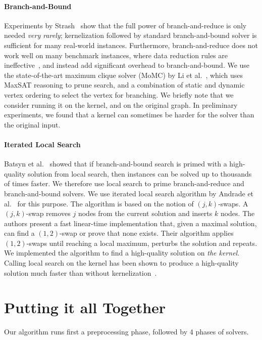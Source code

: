 \documentclass[a4paper,UKenglish]{lipics-v2016}
\begin{document}
\paragraph*{Branch-and-Bound} Experiments by Strash~\cite{} show that the full power of branch-and-reduce is only needed \emph{very rarely}; kernelization followed by standard branch-and-bound solver is sufficient for many real-world instances. Furthermore, branch-and-reduce does not work well on many benchmark instances, where data reduction rules are ineffective~\cite{akiba-tcs-2016}, and instead add significant overhead to branch-and-bound.  We use the state-of-the-art maximum clique solver (MoMC) by Li et al.~\cite{}, which uses MaxSAT reasoning to prune search, and a combination of static and dynamic vertex ordering to select the vertex for branching. We briefly note that we consider running it on the kernel, and on the original graph. In preliminary experiments, we found that a kernel can sometimes be harder for the solver than the original input.

\paragraph*{Iterated Local Search}
Batsyn et al.~\cite{} showed that if branch-and-bound search is primed with a high-quality solution from local search, then instances can be solved up to thousands of times faster. We therefore use local search to prime branch-and-reduce and branch-and-bound solvers. 
We use iterated local search algorithm by Andrade et al.~\cite{DBLP:conf/wea/AndradeRW08} for this purpose.
The algorithm is based on the notion of $(j,k)$-swaps. A $(j,k)$-swap removes $j$ nodes from the current solution and inserts $k$ nodes. The authors present a fast linear-time implementation that, given a maximal solution, can find a $(1,2)$-swap or prove that none exists. Their algorithm applies $(1,2)$-swaps until reaching a local maximum, perturbs the solution and repeats. We implemented the algorithm to find a high-quality solution on \emph{the kernel}. Calling local search on the kernel has been shown to produce a high-quality solution much faster than without kernelization~\cite{dahlum,chang2017computing}.

\section{Putting it all Together}
Our algorithm runs first a preprocessing phase, followed by 4 phases of solvers.
\end{document}
